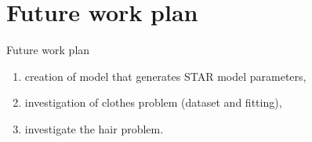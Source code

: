 \documentclass[10pt,pdf,hyperref={unicode}]{beamer}
\begin{document}





\section{Future work plan}
\begin{frame}{Future work plan}
\begin{enumerate}[1.]
    \item creation of model that generates STAR model parameters,
    \item investigation of clothes problem (dataset and fitting),
    \item investigate the hair problem.
\end{enumerate}
\end{frame}

\end{document}
